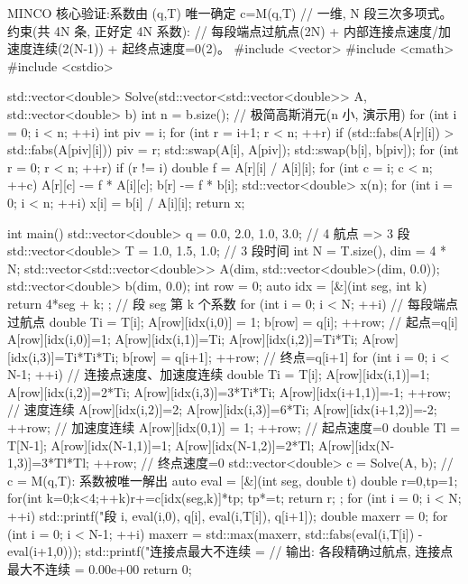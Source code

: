 \begin{codebox}[C++]{MINCO 核心验证:系数由 (q,T) 唯一确定 c=M(q,T)}
// 一维, N 段三次多项式。约束(共 4N 条, 正好定 4N 系数):
//   每段端点过航点(2N) + 内部连接点速度/加速度连续(2(N-1)) + 起终点速度=0(2)。
#include <vector>
#include <cmath>
#include <cstdio>

std::vector<double> Solve(std::vector<std::vector<double>> A, std::vector<double> b) {
  int n = b.size();                                // 极简高斯消元(n 小, 演示用)
  for (int i = 0; i < n; ++i) {
    int piv = i;
    for (int r = i+1; r < n; ++r) if (std::fabs(A[r][i]) > std::fabs(A[piv][i])) piv = r;
    std::swap(A[i], A[piv]); std::swap(b[i], b[piv]);
    for (int r = 0; r < n; ++r) if (r != i) {
      double f = A[r][i] / A[i][i];
      for (int c = i; c < n; ++c) A[r][c] -= f * A[i][c];
      b[r] -= f * b[i];
    }
  }
  std::vector<double> x(n);
  for (int i = 0; i < n; ++i) x[i] = b[i] / A[i][i];
  return x;
}

int main() {
  std::vector<double> q = {0.0, 2.0, 1.0, 3.0};   // 4 航点 => 3 段
  std::vector<double> T = {1.0, 1.5, 1.0};        // 3 段时间
  int N = T.size(), dim = 4 * N;
  std::vector<std::vector<double>> A(dim, std::vector<double>(dim, 0.0));
  std::vector<double> b(dim, 0.0);
  int row = 0;
  auto idx = [&](int seg, int k){ return 4*seg + k; };  // 段 seg 第 k 个系数
  for (int i = 0; i < N; ++i) {                   // 每段端点过航点
    double Ti = T[i];
    A[row][idx(i,0)] = 1; b[row] = q[i]; ++row;                          // 起点=q[i]
    A[row][idx(i,0)]=1; A[row][idx(i,1)]=Ti; A[row][idx(i,2)]=Ti*Ti;
    A[row][idx(i,3)]=Ti*Ti*Ti; b[row] = q[i+1]; ++row;                   // 终点=q[i+1]
  }
  for (int i = 0; i < N-1; ++i) {                 // 连接点速度、加速度连续
    double Ti = T[i];
    A[row][idx(i,1)]=1; A[row][idx(i,2)]=2*Ti; A[row][idx(i,3)]=3*Ti*Ti;
    A[row][idx(i+1,1)]=-1; ++row;                                        // 速度连续
    A[row][idx(i,2)]=2; A[row][idx(i,3)]=6*Ti; A[row][idx(i+1,2)]=-2; ++row; // 加速度连续
  }
  A[row][idx(0,1)] = 1; ++row;                    // 起点速度=0
  double Tl = T[N-1];
  A[row][idx(N-1,1)]=1; A[row][idx(N-1,2)]=2*Tl; A[row][idx(N-1,3)]=3*Tl*Tl; ++row; // 终点速度=0
  std::vector<double> c = Solve(A, b);            // c = M(q,T): 系数被唯一解出
  auto eval = [&](int seg, double t){
    double r=0,tp=1; for(int k=0;k<4;++k){r+=c[idx(seg,k)]*tp; tp*=t;} return r; };
  for (int i = 0; i < N; ++i)
    std::printf("段%
                i, eval(i,0), q[i], eval(i,T[i]), q[i+1]);
  double maxerr = 0;
  for (int i = 0; i < N-1; ++i)
    maxerr = std::max(maxerr, std::fabs(eval(i,T[i]) - eval(i+1,0)));
  std::printf("连接点最大不连续 = %
  // 输出: 各段精确过航点, 连接点最大不连续 = 0.00e+00
  return 0;
}
\end{codebox}

